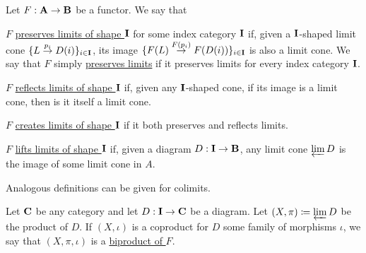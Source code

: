 \begin{definition}\label{def:categorical_limit_preservation}\cite[definitions 5.3.1, 5.3.5]{Leinster2014}
  Let $F: \operatorname{\mathbf{A}} \to \operatorname{\mathbf{B}}$ be a functor. We say that
  \begin{defenum}
    \item\label{def:categorical_limit_preservation/preserve} $F$ \uline{preserves limits of shape $\operatorname{\mathbf{I}}$} for some index category $\operatorname{\mathbf{I}}$ if, given a $\operatorname{\mathbf{I}}$-shaped limit cone \mbox{$\{ L \overset {p_i} \to D(i) \}_{i \in \operatorname{\mathbf{I}}}$}, its image \mbox{$\{ F(L) \overset {F(p_i)} \to F(D(i)) \}_{i \in \operatorname{\mathbf{I}}}$} is also a limit cone. We say that $F$ simply \uline{preserves limits} if it preserves limits for every index category $\operatorname{\mathbf{I}}$.

    \item\label{def:categorical_limit_preservation/reflect} $F$ \uline{reflects limits of shape $\operatorname{\mathbf{I}}$} if, given any $\operatorname{\mathbf{I}}$-shaped cone, if its image is a limit cone, then is it itself a limit cone.

    \item\label{def:categorical_limit_preservation/create} $F$ \uline{creates limits of shape $\operatorname{\mathbf{I}}$} if it both preserves and reflects limits.

    \item\label{def:categorical_limit_preservation/lift} $F$ \uline{lifts limits of shape $\operatorname{\mathbf{I}}$} if, given a diagram $D: \operatorname{\mathbf{I}} \to \operatorname{\mathbf{B}}$, any limit cone $\varprojlim D$ is the image of some limit cone in $A$.
  \end{defenum}
\end{definition}

\begin{note}\label{note:categorical_colimit_preservation}
  Analogous definitions can be given for colimits.
\end{note}

\begin{definition}\label{def:categorical_biproduct}
  Let $\operatorname{\mathbf{C}}$ be any category and let $D: \operatorname{\mathbf{I}} \to \operatorname{\mathbf{C}}$ be a diagram. Let $(X, \pi) \coloneqq \varprojlim D$ be the product of $D$. If $(X, \iota)$ is a coproduct for $D$ some family of morphisms $\iota$, we say that $(X, \pi, \iota)$ is a \uline{biproduct of $F$}.
\end{definition}
